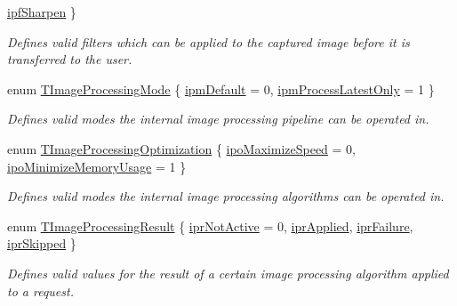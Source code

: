 \begin{DoxyCompactItemize}
\hyperlink{group___common_interface_gga78ae15c334c800044e1b7042975fc829ac6321769819525cbf794435809a2980e}{ipf\+Sharpen}
 \}
\begin{DoxyCompactList}\small\item\em Defines valid filters which can be applied to the captured image before it is transferred to the user. \end{DoxyCompactList}\item 
enum \hyperlink{group___common_interface_gaee0074fce284fcdf9ead4ad607e85a06}{T\+Image\+Processing\+Mode} \{ \hyperlink{group___common_interface_ggaee0074fce284fcdf9ead4ad607e85a06a1247c3b24698cfab3b12e6e4deb117cd}{ipm\+Default} = 0, 
\hyperlink{group___common_interface_ggaee0074fce284fcdf9ead4ad607e85a06a9ba2cff7d616a7bb77aa739c2066c797}{ipm\+Process\+Latest\+Only} = 1
 \}
\begin{DoxyCompactList}\small\item\em Defines valid modes the internal image processing pipeline can be operated in. \end{DoxyCompactList}\item 
enum \hyperlink{group___common_interface_ga9f8538d596e064d7854f355679357965}{T\+Image\+Processing\+Optimization} \{ \hyperlink{group___common_interface_gga9f8538d596e064d7854f355679357965a88d24efe19e3b4a7b794eecb012b7bf9}{ipo\+Maximize\+Speed} = 0, 
\hyperlink{group___common_interface_gga9f8538d596e064d7854f355679357965a5914c1be72745156bd13890a3f72f150}{ipo\+Minimize\+Memory\+Usage} = 1
 \}
\begin{DoxyCompactList}\small\item\em Defines valid modes the internal image processing algorithms can be operated in. \end{DoxyCompactList}\item 
enum \hyperlink{group___common_interface_gac868128de70336bbecd2efbb80ee1309}{T\+Image\+Processing\+Result} \{ \hyperlink{group___common_interface_ggac868128de70336bbecd2efbb80ee1309ad33ecb32652dc72fe58a6f4b475a901e}{ipr\+Not\+Active} = 0, 
\hyperlink{group___common_interface_ggac868128de70336bbecd2efbb80ee1309a3532d000e27d6b280d941e3994ea040d}{ipr\+Applied}, 
\hyperlink{group___common_interface_ggac868128de70336bbecd2efbb80ee1309a4a955cd64484e25ac70242c4e33e3f2b}{ipr\+Failure}, 
\hyperlink{group___common_interface_ggac868128de70336bbecd2efbb80ee1309a28314ccb4b389b376fa7023eb72b5cbb}{ipr\+Skipped}
 \}
\begin{DoxyCompactList}\small\item\em Defines valid values for the result of a certain image processing algorithm applied to a request. \end{DoxyCompactList}\item 

\end{DoxyCompactItemize}
